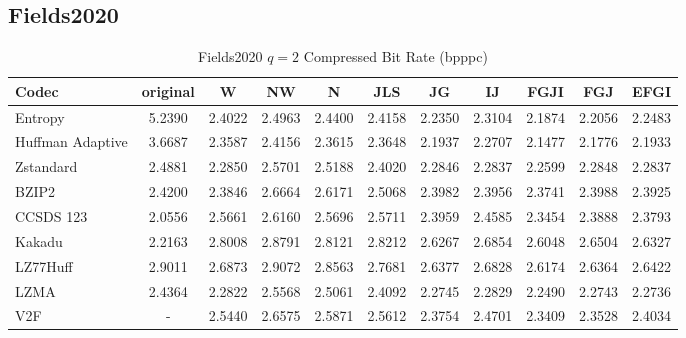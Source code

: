 \documentclass{article}
\begin{document}
\subsection{Fields2020}
\begin{table}[h!]
\centering
\caption{Fields2020 $q=2$ Compressed Bit Rate (bpppc)}
\begin{tabular}{|l|cccccccccc|}
\hline
Codec &  original &      W &     NW &      N &    JLS &     JG &     IJ &   FGJI &    FGJ &   EFGI \\
\hline
Entropy & 5.2390 & 2.4022 & 2.4963 & 2.4400 & 2.4158 & 2.2350 & 2.3104 & 2.1874 & 2.2056 & 2.2483 \\
\hline
Huffman Adaptive &    3.6687 & 2.3587 & 2.4156 & 2.3615 & 2.3648 & 2.1937 & 2.2707 & 2.1477 & 2.1776 & 2.1933 \\
Zstandard        &    2.4881 & 2.2850 & 2.5701 & 2.5188 & 2.4020 & 2.2846 & 2.2837 & 2.2599 & 2.2848 & 2.2837 \\
BZIP2            &    2.4200 & 2.3846 & 2.6664 & 2.6171 & 2.5068 & 2.3982 & 2.3956 & 2.3741 & 2.3988 & 2.3925 \\
CCSDS 123        &    2.0556 & 2.5661 & 2.6160 & 2.5696 & 2.5711 & 2.3959 & 2.4585 & 2.3454 & 2.3888 & 2.3793 \\
Kakadu           &    2.2163 & 2.8008 & 2.8791 & 2.8121 & 2.8212 & 2.6267 & 2.6854 & 2.6048 & 2.6504 & 2.6327 \\
LZ77Huff         &    2.9011 & 2.6873 & 2.9072 & 2.8563 & 2.7681 & 2.6377 & 2.6828 & 2.6174 & 2.6364 & 2.6422 \\
LZMA             &    2.4364 & 2.2822 & 2.5568 & 2.5061 & 2.4092 & 2.2745 & 2.2829 & 2.2490 & 2.2743 & 2.2736 \\
V2F              &   - & 2.5440 & 2.6575 & 2.5871 & 2.5612 & 2.3754 & 2.4701 & 2.3409 & 2.3528 & 2.4034 \\
\hline
\end{tabular}
\end{table}
\end{document}
